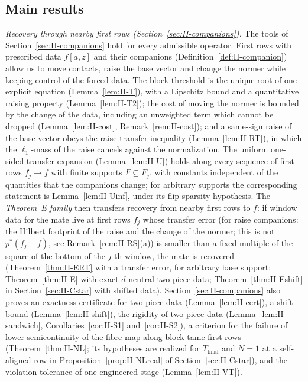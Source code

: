 \documentclass[10pt]{amsart}
\theoremstyle{definition}
\theoremstyle{remark}
\begin{document}
\subsection{Main results}
\emph{Recovery through nearby first rows (Section~\ref{sec:II-companions}).}
The tools of Section~\ref{sec:II-companions} hold for every admissible
operator.  First rows with prescribed data $f[a,z]$ and their companions
(Definition~\ref{def:II-companion}) allow us to move contacts, raise the
base vector and change the normer while keeping control of the forced
data.  The block threshold is the unique root of one explicit equation
(Lemma~\ref{lem:II-T}), with a Lipschitz bound and a quantitative raising
property (Lemma~\ref{lem:II-T2}); the cost of moving the normer is bounded
by the change of the data, including an unweighted term which cannot be
dropped (Lemma~\ref{lem:II-cost}, Remark~\ref{rem:II-cost}); and a same-sign
raise of the base vector obeys the raise-transfer inequality
(Lemma~\ref{lem:II-RT}), in which the $\ell_1$-mass of the raise cancels
against the normalization.  The uniform one-sided transfer expansion
(Lemma~\ref{lem:II-U}) holds along every sequence of first rows
$f_j\to f$ with finite supports $F\subseteq F_j$, with constants
independent of the quantities that the companions change; for arbitrary
supports the corresponding statement is Lemma~\ref{lem:II-Uinf}, under its
flip-sparsity hypothesis.  The \emph{Theorem~E family} then transfers
recovery from nearby first rows to $f$: if window data for the mate live at
first rows $f_j$ whose transfer error (for raise companions: the Hilbert
footprint of the raise and the change of the normer; this is not
$p^*(f_j-f)$, see Remark~\ref{rem:II-RS}(a)) is smaller than a fixed
multiple of the square of the bottom of the $j$-th window, the mate is
recovered
(Theorem~\ref{thm:II-ERT} with a transfer error, for arbitrary base
support; Theorem~\ref{thm:II-E} with exact $d$-neutral two-piece data;
Theorem~\ref{thm:II-Eshift} in Section~\ref{sec:II-Cstar} with shifted
data).  Section~\ref{sec:II-companions} also proves an exactness
certificate for two-piece data (Lemma~\ref{lem:II-cert}), a shift bound
(Lemma~\ref{lem:II-shift}), the rigidity of two-piece data
(Lemma~\ref{lem:II-sandwich}, Corollaries~\ref{cor:II-S1}
and~\ref{cor:II-S2}), a criterion for the failure of lower semicontinuity
of the fibre map along block-tame first rows (Theorem~\ref{thm:II-NL}; its
hypotheses are realized for $T_{\mathrm{final}}$ and $N=1$ at a self-aligned
row in Proposition~\ref{prop:II-NLreal} of Section~\ref{sec:II-Cstar}), and
the violation
tolerance of one engineered stage (Lemma~\ref{lem:II-VT}).
\end{document}
